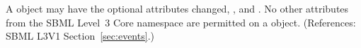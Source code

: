 A \Priority object may have the optional attributes  changed{, ,}  and
.  No other attributes from the SBML Level~3 Core namespace
are permitted on a \Priority object.  (References: SBML L3V1
Section~\ref{sec:events}.)
